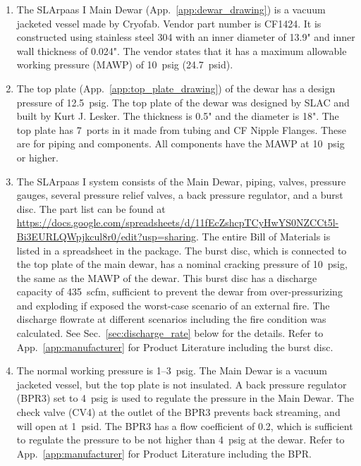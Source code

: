 \begin{enumerate}
    \item The SLArpaas I Main Dewar (App.~\ref{app:dewar_drawing}) is a vacuum jacketed 
    vessel made by Cryofab. Vendor part number is CF1424.
    It is constructed using stainless steel 304 with an inner diameter of 13.9" 
    and inner wall thickness of 0.024". 
    The vendor states that it has a maximum allowable working pressure (MAWP) 
    of 10~psig (24.7~psid).
    \item The top plate (App.~\ref{app:top_plate_drawing}) of the dewar has a design 
    pressure of 12.5~psig. 
    The top plate of the dewar was designed by SLAC and built by Kurt J. Lesker.
    The thickness is 0.5" and the diameter is 18". 
    The top plate has 7~ports in it made from tubing and CF Nipple Flanges. 
    These are for piping and components. All components have the MAWP at 10~psig or higher.
    \item The SLArpaas I system consists of the Main Dewar, piping, valves, pressure gauges, 
    several pressure relief valves, a back pressure regulator, and a burst disc. 
    The part list can be found at 
    \url{https://docs.google.com/spreadsheets/d/11fEcZshcpTCyHwYS0NZCCt5l-Bi3EURLQWpjkcul8r0/edit?usp=sharing}. 
    The entire Bill of Materials is listed in a spreadsheet in the package. 
    The burst disc, which is connected to the top plate of the main dewar, 
    has a nominal cracking pressure of 10~psig, the same as the MAWP of the dewar. 
    This burst disc has a discharge capacity of 435~scfm, sufficient to prevent the dewar 
    from over-pressurizing and exploding if exposed the worst-case scenario of an external fire. 
    The discharge flowrate at different scenarios including the fire condition was calculated. 
    See Sec.~\ref{sec:discharge_rate} below for the details. 
    Refer to App.~\ref{app:manufacturer} for Product Literature including the burst disc.
    \item The normal working pressure is 1--3~psig. 
    The Main Dewar is a vacuum jacketed vessel, but the top plate is not insulated. 
    A back pressure regulator (BPR3) set to 4~psig is used to regulate the pressure in the Main Dewar.
    The check valve (CV4) at the outlet of the BPR3 prevents back streaming, and will open
    at 1~psid. 
    The BPR3 has a flow coefficient of 0.2, which is sufficient to regulate the pressure to 
    be not higher than 4~psig at the dewar. 
    Refer to App.~\ref{app:manufacturer} for Product Literature including the BPR.
\end{enumerate}
